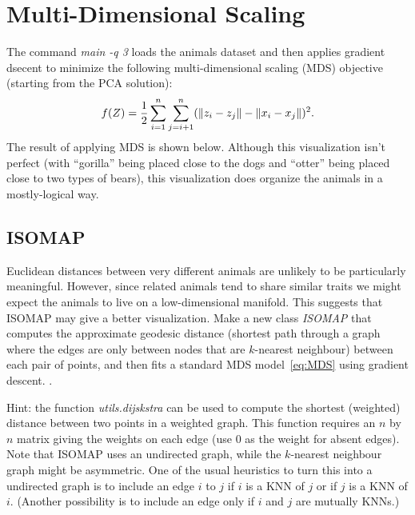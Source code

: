 \documentclass{article}
\begin{document}
\section{Multi-Dimensional Scaling}

The command \emph{main -q 3} loads the animals dataset and then applies gradient dsecent to minimize the following multi-dimensional scaling (MDS) objective (starting from the PCA solution):
\begin{equation}
\label{eq:MDS}
f(Z) =  \frac{1}{2}\sum_{i=1}^n\sum_{j=i+1}^n (  \|z_i - z_j\| - \|x_i - x_j\|)^2.
\end{equation}
 The result of applying MDS is shown below.
Although this visualization isn't perfect (with ``gorilla'' being placed close to the dogs and ``otter'' being placed close to two types of bears), this visualization does organize the animals in a mostly-logical way.


\subsection{ISOMAP}

Euclidean distances between very different animals are unlikely to be particularly meaningful. However, since related animals tend to share similar traits we might expect the animals to live on a low-dimensional manifold. This suggests that ISOMAP may give a better visualization. 
Make a new class \emph{ISOMAP} that computes the approximate geodesic distance (shortest path through a graph where the edges are only between nodes that are $k$-nearest neighbour) between each pair of points, and then fits a standard MDS model~\eqref{eq:MDS} using gradient descent. .

Hint: the function \emph{utils.dijskstra} can be used to compute the shortest (weighted) distance between two points in a weighted graph. This function requires an $n$ by $n$ matrix giving the weights on each edge (use $0$ as the weight for absent edges). Note that ISOMAP uses an undirected graph, while the $k$-nearest neighbour graph might be asymmetric. One of the usual heuristics to turn this into a undirected graph is to include an edge $i$ to $j$ if $i$ is a KNN of $j$ or if $j$ is a KNN of $i$. (Another possibility is to include an edge only if $i$ and $j$ are mutually KNNs.)

\end{document}
